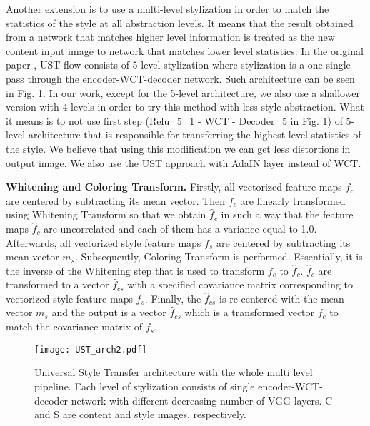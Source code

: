 \documentclass{llncs}
\begin{document}
Another extension is to use a multi-level stylization in order to match the statistics of the style at all abstraction levels. It means that the result obtained from a network that matches higher level information is treated as the new content input image to network that matches lower level statistics. In the original paper \cite{universal:style}, UST flow consists of 5 level stylization where stylization is a one single pass through the encoder-WCT-decoder network. Such architecture can be seen in Fig. \ref{ust:arch2}. In our work, except for the 5-level architecture, we also use a shallower version with 4 levels in order to try this method with less style abstraction. What it means is to not use first step (Relu\_5\_1 - WCT - Decoder\_5 in Fig. \ref{ust:arch2}) of 5-level architecture that is responsible for transferring the highest level statistics of the style. We believe that using this modification we can get less distortions in output image. We also use the UST approach with AdaIN layer instead of WCT.

\bigskip
\textbf{Whitening and Coloring Transform.}
Firstly, all vectorized feature maps $f_c$ are centered by subtracting its mean vector. Then $f_c$ are linearly transformed using Whitening Transform so that we obtain $\widehat{f}_c$ in such a way that the feature maps $\widehat{f}_c$ are uncorrelated and each of them has a variance equal to 1.0. Afterwards, all vectorized style feature maps $f_s$ are centered by subtracting its mean vector $m_s$. Subsequently, Coloring Transform is performed. Essentially, it is the inverse of the Whitening step that is used to transform $f_c$ to $\widehat{f}_c$. $\widehat{f}_c$ are transformed to a vector $\widehat{f}_{cs}$ with a specified covariance matrix corresponding to vectorized style feature maps $f_s$. Finally, the $\widehat{f}_{cs}$ is re-centered with the mean vector $m_s$ and the output is a vector $\widehat{f}_{cs}$ which is a transformed vector $f_c$ to match the covariance matrix of $f_s$. %

\begin{figure}[H]
  \centering
  \texttt{[image: UST\_arch2.pdf]}
  \caption{Universal Style Transfer architecture with the whole multi level pipeline. Each level of stylization consists of single encoder-WCT-decoder network with different decreasing number of VGG layers. C and S are content and style images, respectively. \label{ust:arch2}}
\end{figure}
\end{document}
